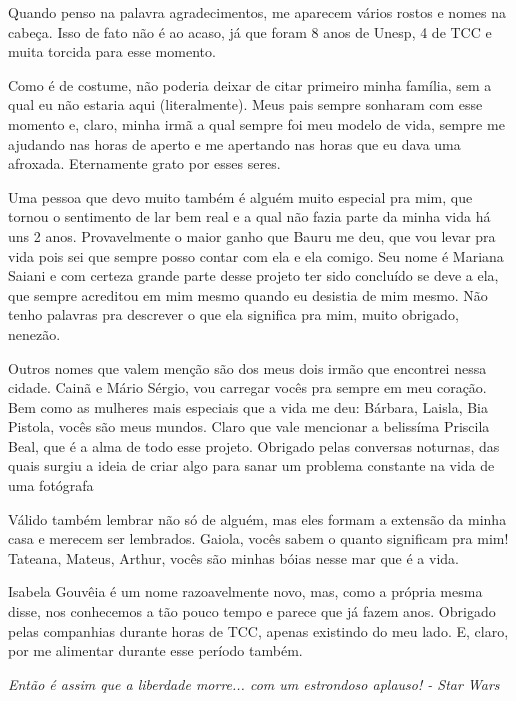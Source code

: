 \documentclass[
	12pt,				%
	openright,			%
	oneside,			%
	a4paper,			%
	english,			%
	french,				%
	spanish,			%
	brazil				%
	]{abntex2}
\begin{document}
\begin{agradecimentos}
Quando penso na palavra agradecimentos, me aparecem vários rostos e nomes na cabeça. Isso de fato não é ao acaso, já que foram 8 anos de Unesp, 4 de TCC e muita torcida para esse momento.

Como é de costume, não poderia deixar de citar primeiro minha família, sem a qual eu não estaria aqui (literalmente). Meus pais sempre sonharam com esse momento e, claro, minha irmã a qual sempre foi meu modelo de vida, sempre me ajudando nas horas de aperto e me apertando nas horas que eu dava uma afroxada. Eternamente grato por esses seres.

Uma pessoa que devo muito também é alguém muito especial pra mim, que tornou o sentimento de lar bem real e a qual não fazia parte da minha vida há uns 2 anos. Provavelmente o maior ganho que Bauru me deu, que vou levar pra vida pois sei que sempre posso contar com ela e ela comigo. Seu nome é Mariana Saiani e com certeza grande parte desse projeto ter sido concluído se deve a ela, que sempre acreditou em mim mesmo quando eu desistia de mim mesmo. Não tenho palavras pra descrever o que ela significa pra mim, muito obrigado, nenezão.

Outros nomes que valem menção são dos meus dois irmão que encontrei nessa cidade. Cainã e Mário Sérgio, vou carregar vocês pra sempre em meu coração. Bem como as mulheres mais especiais que a vida me deu: Bárbara, Laisla, Bia Pistola, vocês são meus mundos. Claro que vale mencionar a belissíma Priscila Beal, que é a alma de todo esse projeto. Obrigado pelas conversas noturnas, das quais surgiu a ideia de criar algo para sanar um problema constante na vida de uma fotógrafa

Válido também lembrar não só de alguém, mas eles formam a extensão da minha casa e merecem ser lembrados. Gaiola, vocês sabem o quanto significam pra mim! Tateana, Mateus, Arthur, vocês são minhas bóias nesse mar que é a vida.

Isabela Gouvêia é um nome razoavelmente novo, mas, como a própria mesma disse, nos conhecemos a tão pouco tempo e parece que já fazem anos. Obrigado pelas companhias durante horas de TCC, apenas existindo do meu lado. E, claro, por me alimentar durante esse período também.
\end{agradecimentos}

\begin{epigrafe}
    \vspace*{\fill}
	\begin{flushright}
		\textit{Então é assim que a liberdade morre... com um estrondoso aplauso! - Star Wars}
	\end{flushright}
\end{epigrafe}
\end{document}
